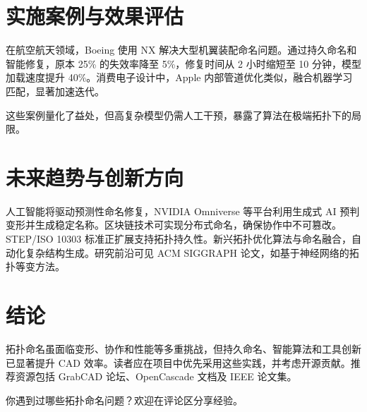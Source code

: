 \chapter{实施案例与效果评估}
在航空航天领域，Boeing 使用 NX 解决大型机翼装配命名问题。通过持久命名和智能修复，原本 25\%{} 的失效率降至 5\%{}，修复时间从 2 小时缩短至 10 分钟，模型加载速度提升 40\%{}。消费电子设计中，Apple 内部管道优化类似，融合机器学习匹配，显著加速迭代。\par
这些案例量化了益处，但高复杂模型仍需人工干预，暴露了算法在极端拓扑下的局限。\par
\chapter{未来趋势与创新方向}
人工智能将驱动预测性命名修复，NVIDIA Omniverse 等平台利用生成式 AI 预判变形并生成稳定名称。区块链技术可实现分布式命名，确保协作中不可篡改。STEP/ISO 10303 标准正扩展支持拓扑持久性。新兴拓扑优化算法与命名融合，自动化复杂结构生成。研究前沿可见 ACM SIGGRAPH 论文，如基于神经网络的拓扑等变方法。\par
\chapter{结论}
拓扑命名虽面临变形、协作和性能等多重挑战，但持久命名、智能算法和工具创新已显著提升 CAD 效率。读者应在项目中优先采用这些实践，并考虑开源贡献。推荐资源包括 GrabCAD 论坛、OpenCascade 文档及 IEEE 论文集。\par
你遇到过哪些拓扑命名问题？欢迎在评论区分享经验。\par
